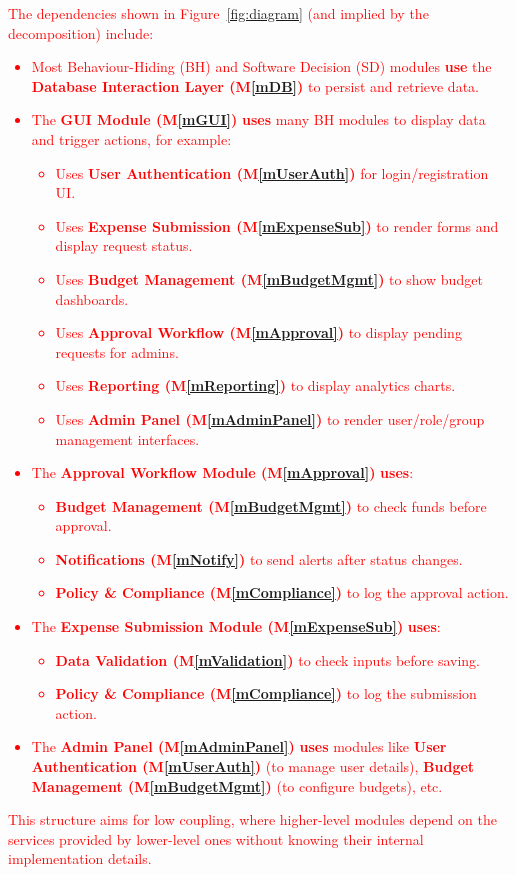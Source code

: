 \documentclass[12pt, titlepage]{article}
\newcommand{\mref}[1]{M\ref{#1}}
\begin{document}
\textcolor{red}{
The dependencies shown in Figure~\ref{fig:diagram} (and implied by the decomposition) include:
\begin{itemize}
    \item Most Behaviour-Hiding (BH) and Software Decision (SD) modules \textbf{use} the \textbf{Database Interaction Layer (\mref{mDB})} to persist and retrieve data.
    \item The \textbf{GUI Module (\mref{mGUI})} \textbf{uses} many BH modules to display data and trigger actions, for example:
        \begin{itemize}
            \item Uses \textbf{User Authentication (\mref{mUserAuth})} for login/registration UI.
            \item Uses \textbf{Expense Submission (\mref{mExpenseSub})} to render forms and display request status.
            \item Uses \textbf{Budget Management (\mref{mBudgetMgmt})} to show budget dashboards.
            \item Uses \textbf{Approval Workflow (\mref{mApproval})} to display pending requests for admins.
            \item Uses \textbf{Reporting (\mref{mReporting})} to display analytics charts.
            \item Uses \textbf{Admin Panel (\mref{mAdminPanel})} to render user/role/group management interfaces.
        \end{itemize}
    \item The \textbf{Approval Workflow Module (\mref{mApproval})} \textbf{uses}:
        \begin{itemize}
            \item \textbf{Budget Management (\mref{mBudgetMgmt})} to check funds before approval.
            \item \textbf{Notifications (\mref{mNotify})} to send alerts after status changes.
            \item \textbf{Policy \& Compliance (\mref{mCompliance})} to log the approval action.
        \end{itemize}
    \item The \textbf{Expense Submission Module (\mref{mExpenseSub})} \textbf{uses}:
        \begin{itemize}
             \item \textbf{Data Validation (\mref{mValidation})} to check inputs before saving.
             \item \textbf{Policy \& Compliance (\mref{mCompliance})} to log the submission action.
        \end{itemize}
    \item The \textbf{Admin Panel (\mref{mAdminPanel})} \textbf{uses} modules like \textbf{User Authentication (\mref{mUserAuth})} (to manage user details), \textbf{Budget Management (\mref{mBudgetMgmt})} (to configure budgets), etc.
\end{itemize}
This structure aims for low coupling, where higher-level modules depend on the services provided by lower-level ones without knowing their internal implementation details.
}
\end{document}
